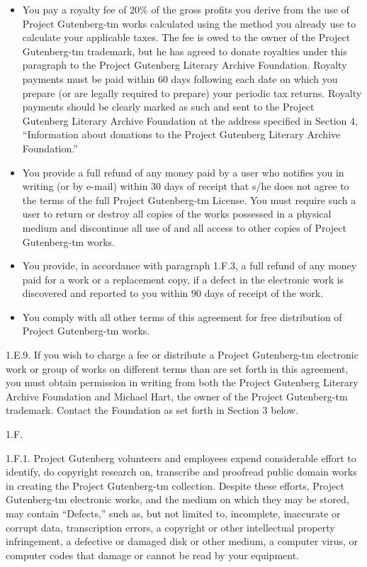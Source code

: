 \documentclass[12pt,oneside]{scrbook}
\begin{document}
  \begin{itemize}
  \item
    You pay a royalty fee of 20\% of the gross profits you derive from the
    use of Project Gutenberg-tm works calculated using the method you
    already use to calculate your applicable taxes. The fee is owed to the
    owner of the Project Gutenberg-tm trademark, but he has agreed to
    donate royalties under this paragraph to the Project Gutenberg
    Literary Archive Foundation. Royalty payments must be paid within 60
    days following each date on which you prepare (or are legally required
    to prepare) your periodic tax returns. Royalty payments should be
    clearly marked as such and sent to the Project Gutenberg Literary
    Archive Foundation at the address specified in Section 4,
    ``Information about donations to the Project Gutenberg Literary
    Archive Foundation.''
  \item
    You provide a full refund of any money paid by a user who notifies you
    in writing (or by e-mail) within 30 days of receipt that s/he does not
    agree to the terms of the full Project Gutenberg-tm License. You must
    require such a user to return or destroy all copies of the works
    possessed in a physical medium and discontinue all use of and all
    access to other copies of Project Gutenberg-tm works.
  \item
    You provide, in accordance with paragraph 1.F.3, a full refund of any
    money paid for a work or a replacement copy, if a defect in the
    electronic work is discovered and reported to you within 90 days of
    receipt of the work.
  \item
    You comply with all other terms of this agreement for free
    distribution of Project Gutenberg-tm works.
  \end{itemize}
  
  1.E.9. If you wish to charge a fee or distribute a Project Gutenberg-tm
  electronic work or group of works on different terms than are set forth
  in this agreement, you must obtain permission in writing from both the
  Project Gutenberg Literary Archive Foundation and Michael Hart, the
  owner of the Project Gutenberg-tm trademark. Contact the Foundation as
  set forth in Section 3 below.
  
  1.F.
  
  1.F.1. Project Gutenberg volunteers and employees expend considerable
  effort to identify, do copyright research on, transcribe and proofread
  public domain works in creating the Project Gutenberg-tm collection.
  Despite these efforts, Project Gutenberg-tm electronic works, and the
  medium on which they may be stored, may contain ``Defects,'' such as,
  but not limited to, incomplete, inaccurate or corrupt data,
  transcription errors, a copyright or other intellectual property
  infringement, a defective or damaged disk or other medium, a computer
  virus, or computer codes that damage or cannot be read by your
  equipment.
  
\end{document}
